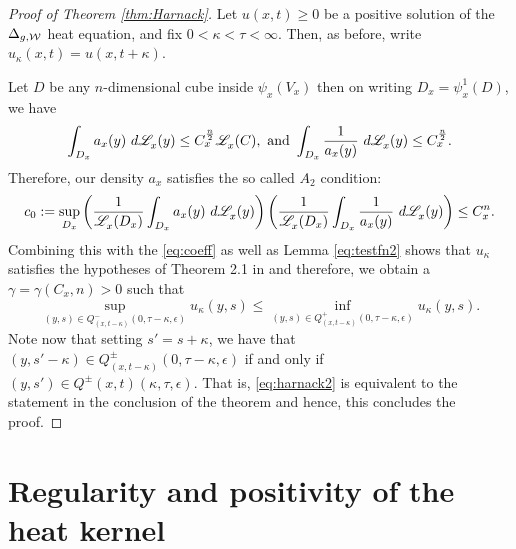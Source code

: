 \documentclass[a4paper, 12pt]{amsart}
\begin{document}
\begin{proof}[Proof of Theorem \ref{thm:Harnack}]
Let $u(x,t) \geq 0$ be a positive solution of
the $\Delta_{g,\mathcal{W}}$ heat equation, and fix $0 < \kappa < \tau < \infty$. 
Then, as before, write $u_\kappa(x,t) = u(x,t+\kappa)$.

Let $D$ be any $n$-dimensional cube inside $\psi_x(V_x)$ then 
on writing $D_x = \psi_x^{1}(D)$, we have  
$$ \int_{D_x} a_x(y)\ d\Leb_x(y) \leq C_x^{\frac{n}{2}} \Leb_x(C),
\ \text{and}\ 
\int_{D_x} \frac{1}{a_x(y)}\ d\Leb_x(y) \leq C_x^{\frac{n}{2}}.$$
Therefore, our density $a_x$ satisfies the so called $A_2$ condition:
$$c_0 := \sup_{D_x} \left( \frac{1}{\mathscr{L}^{{}}_x(D_x)} \int_{D_x} a_x(y)\ d\mathscr{L}^{{}}_x(y)\right)
\left( \frac{1}{\mathscr{L}^{{}}_x(D_x)} \int_{D_x} \frac{1}{a_x(y)}\ d\mathscr{L}^{{}}_x(y)\right) 
	\leq C_x^n.$$
Combining this with the \eqref{eq:coeff} as
well as Lemma \eqref{eq:testfn2} shows that $u_\kappa$
satisfies the hypotheses of Theorem 2.1 in \cite{CS} and
therefore, we obtain a $\gamma = \gamma(C_x, n) > 0$
such that 
\begin{equation} 
\label{eq:harnack2} 
\sup_{(y,s) \in Q_{(x,t-\kappa)}^-(0, \tau - \kappa, \epsilon)} u_\kappa(y,s)
		\leq \inf_{(y,s) \in Q^+_{(x,t-\kappa)}(0, \tau - \kappa, \epsilon)} u_\kappa(y,s).
\end{equation}
Note now that setting $s' = s + \kappa$, we have that
$(y, s' - \kappa) \in Q^{\pm}_{(x,t- \kappa)}(0, \tau - \kappa, \epsilon)$
if and only if $(y, s') \in Q^{\pm}(x,t)(\kappa, \tau, \epsilon)$.
That is, \eqref{eq:harnack2} is equivalent to the statement 
in the conclusion of the theorem and hence, this concludes
the proof.
\end{proof} 

\section{Regularity and positivity of the heat kernel}

\printbibliography
\end{document}

